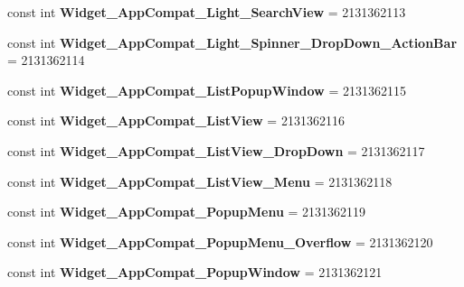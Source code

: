 \begin{DoxyCompactItemize}
const int {\bfseries Widget\+\_\+\+App\+Compat\+\_\+\+Light\+\_\+\+Search\+View} = 2131362113
\item 
\mbox{\label{classXaria_1_1Resource_1_1Style_a90102b60ce6b1e21da9f9482ade0171a}} 
const int {\bfseries Widget\+\_\+\+App\+Compat\+\_\+\+Light\+\_\+\+Spinner\+\_\+\+Drop\+Down\+\_\+\+Action\+Bar} = 2131362114
\item 
\mbox{\label{classXaria_1_1Resource_1_1Style_ae003238e5dd888d5e546165dce10bbf9}} 
const int {\bfseries Widget\+\_\+\+App\+Compat\+\_\+\+List\+Popup\+Window} = 2131362115
\item 
\mbox{\label{classXaria_1_1Resource_1_1Style_ae21b331fd82a0e4ddf32b73abb237fb9}} 
const int {\bfseries Widget\+\_\+\+App\+Compat\+\_\+\+List\+View} = 2131362116
\item 
\mbox{\label{classXaria_1_1Resource_1_1Style_aea21f7ccde1f6715ff9c71717e14eeb6}} 
const int {\bfseries Widget\+\_\+\+App\+Compat\+\_\+\+List\+View\+\_\+\+Drop\+Down} = 2131362117
\item 
\mbox{\label{classXaria_1_1Resource_1_1Style_a156ea3a10a5db936ff69b0f81a7a8407}} 
const int {\bfseries Widget\+\_\+\+App\+Compat\+\_\+\+List\+View\+\_\+\+Menu} = 2131362118
\item 
\mbox{\label{classXaria_1_1Resource_1_1Style_a7648c9e63ca27c04777d41cf1d814ff7}} 
const int {\bfseries Widget\+\_\+\+App\+Compat\+\_\+\+Popup\+Menu} = 2131362119
\item 
\mbox{\label{classXaria_1_1Resource_1_1Style_afa51fb2a1f107be06d1cbefe178eab48}} 
const int {\bfseries Widget\+\_\+\+App\+Compat\+\_\+\+Popup\+Menu\+\_\+\+Overflow} = 2131362120
\item 
\mbox{\label{classXaria_1_1Resource_1_1Style_a20c9ac2332e1756ea9fbceb42b864f2a}} 
const int {\bfseries Widget\+\_\+\+App\+Compat\+\_\+\+Popup\+Window} = 2131362121
\item 
\mbox{\label{classXaria_1_1Resource_1_1Style_aaef7ca7902685333f7cc201a995ecda0}} 

\end{DoxyCompactItemize}
